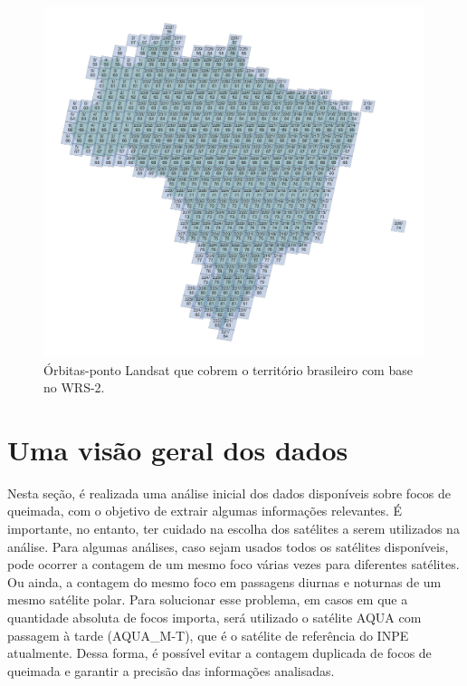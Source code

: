 \documentclass[cic,tc]{iiufrgs}
\begin{document}
\begin{figure}[H]
    \caption{Órbitas-ponto Landsat que cobrem o território brasileiro com base no WRS-2.}
    \begin{center}
        \includegraphics[width=30em]{orbitas_ponto_landsat}
    \end{center}
    \label{fig:orbitas_ponto_landsat}
\end{figure}

\section{Uma visão geral dos dados}
\label{sec:visao_geral}

Nesta seção, é realizada uma análise inicial dos dados disponíveis sobre focos de queimada, com o objetivo de extrair algumas informações relevantes. É importante, no entanto, ter cuidado na escolha dos satélites a serem utilizados na análise. Para algumas análises, caso sejam usados todos os satélites disponíveis, pode ocorrer a contagem de um mesmo foco várias vezes para diferentes satélites. Ou ainda, a contagem do mesmo foco em passagens diurnas e noturnas de um mesmo satélite polar. Para solucionar esse problema, em casos em que a quantidade absoluta de focos importa, será utilizado o satélite AQUA com passagem à tarde (AQUA\_M-T), que é o satélite de referência do INPE atualmente. Dessa forma, é possível evitar a contagem duplicada de focos de queimada e garantir a precisão das informações analisadas. 
\end{document}
